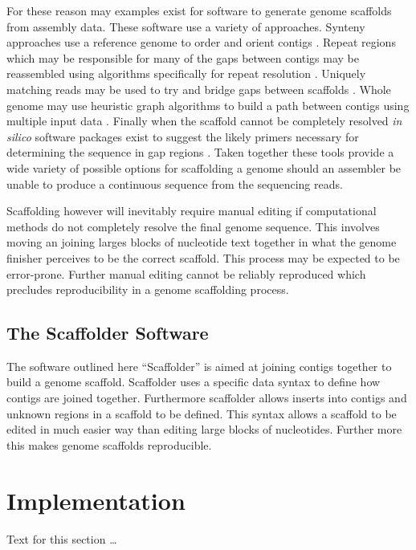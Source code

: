 \documentclass[10pt]{bmc_article}
\newenvironment{bmcformat}{\begin{raggedright}\baselineskip20pt\sloppy\setboolean{publ}{false}}{\end{raggedright}\baselineskip20pt\sloppy}
\begin{document}
\begin{bmcformat}
For these reason may examples exist for software to generate genome scaffolds
from assembly data. These software use a variety of approaches. Synteny
approaches use a reference genome to order and orient contigs
\cite{richter2007,zhao2008}. Repeat regions which may be responsible for many
of the gaps between contigs may be reassembled using algorithms specifically
for repeat resolution \cite{mulyukov2002,koren2010}. Uniquely matching reads
may be used to try and bridge gaps between scaffolds \cite{tsai2010}. Whole
genome may use heuristic graph algorithms to build a path between contigs using
multiple input data \cite{pop2004,dayarian2010}. Finally when the scaffold
cannot be completely resolved \emph{in silico} software packages exist to
suggest the likely primers necessary for determining the sequence in gap
regions \cite{gordon2001,nagarajan2010}. Taken together these tools provide
a wide variety of possible options for scaffolding a genome should an assembler
be unable to produce a continuous sequence from the sequencing reads. \pb

Scaffolding however will inevitably require manual editing if computational
methods do not completely resolve the final genome sequence. This involves
moving an joining larges blocks of nucleotide text together in what the genome
finisher perceives to be the correct scaffold. This process may be expected to
be error-prone. Further manual editing cannot be reliably reproduced which
precludes reproducibility in a genome scaffolding process. \pb

\subsection*{The Scaffolder Software} %

The software outlined here ``Scaffolder'' is aimed at joining contigs together
to build a genome scaffold. Scaffolder uses a specific data syntax to define
how contigs are joined together. Furthermore scaffolder allows inserts into
contigs and unknown regions in a scaffold to be defined. This syntax allows
a scaffold to be edited in much easier way than editing large blocks of
nucleotides. Further more this makes genome scaffolds reproducible.

\section*{Implementation} %

  Text for this section \ldots
 

\end{bmcformat}
\end{document}
